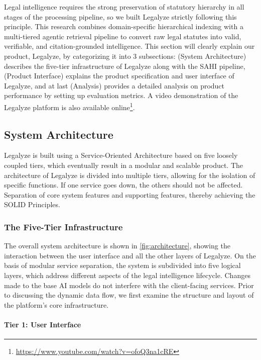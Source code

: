 \indent Legal intelligence requires the strong preservation of statutory hierarchy in all stages of the processing pipeline, so we built Legalyze strictly following this principle. This research combines domain-specific hierarchical indexing with a multi-tiered agentic retrieval pipeline to convert raw legal statutes into valid, verifiable, and citation-grounded intelligence. This section will clearly explain our product, Legalyze, by categorizing it into 3 subsections:  (System Architecture) describes the five-tier infrastructure of Legalyze along with the SAHI pipeline,  (Product Interface) explains the product specification and user interface of Legalyze, and at last  (Analysis) provides a detailed analysis on product performance by setting up evaluation metrics. A video demonstration of the Legalyze platform is also available online\footnote{\normalsize \url{https://www.youtube.com/watch?v=ofoQ3na1cRE}}.

\subsection{System Architecture}
\label{subsec:five_tier_infra}

Legalyze is built using a Service-Oriented Architecture based on five loosely coupled tiers, which eventually result in a modular and scalable product. The architecture of Legalyze is divided into multiple tiers, allowing for the isolation of specific functions. If one service goes down, the others should not be affected. Separation of core system features and supporting features, thereby achieving the SOLID Principles.

\subsubsection{The Five-Tier Infrastructure}

The overall system architecture is shown in \autoref{fig:architecture}, showing the interaction between the user interface and all the other layers of Legalyze. On the basis of modular service separation, the system is subdivided into five logical layers, which address different aspects of the legal intelligence lifecycle. Changes made to the base AI models do not interfere with the client-facing services. Prior to discussing the dynamic data flow, we first examine the structure and layout of the platform's core infrastructure.

\paragraph{\textbf{Tier 1: User Interface}}

